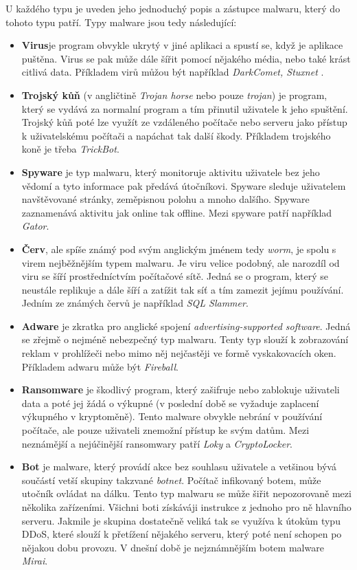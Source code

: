U každého typu je uveden jeho jednoduchý popis a zástupce malwaru, který do tohoto typu patří. Typy malware jsou tedy následující: \cite{kaspersky,article_malware,malware_book,malware_wiki} %
\begin{itemize}
    \item \textbf{Virus}je program obvykle ukrytý v jiné aplikaci a spustí se, když je aplikace puštěna. Virus se pak může dále šířit pomocí nějakého média, nebo také krást citlivá data. Příkladem virů můžou být například \textit{DarkComet, Stuxnet} \cite{malware_types}. 
    \item \textbf{Trojský kůň} (v angličtině \textit{Trojan horse} nebo pouze \textit{trojan}) je program, který se vydává za normalní program a tím přinutil uživatele k jeho spuštění. Trojský kůň poté lze využít ze vzdáleného počítače nebo serveru jako přístup k uživatelskému počítači a napáchat tak další škody. Příkladem trojského koně je třeba \textit{TrickBot}.  
    \item \textbf{Spyware} je typ malwaru, který monitoruje aktivitu uživatele bez jeho vědomí a tyto informace pak předává útočníkovi. Spyware sleduje uživatelem navštěvované stránky, zeměpisnou polohu a mnoho dalšího. Spyware zaznamenává aktivitu jak online tak offline. Mezi spyware patří například \textit{Gator}.
    \item \textbf{Červ}, ale spíše známý pod svým anglickým jménem tedy \textit{worm}, je spolu s virem nejběžnějším typem malwaru. Je viru velice podobný, ale narozdíl od viru se šíří prostředníctvím počítačové sítě. Jedná se o program, který se neustále replikuje a dále šíří a zatížit tak síť a tím zamezit jejímu používání. Jedním ze známých červů je například \textit{SQL Slammer}. 
    \newpage
    \item \textbf{Adware} je zkratka pro anglické spojení \textit{advertising-supported software}. Jedná se zřejmě o nejméně nebezpečný typ malwaru. Tenty typ slouží k zobrazování reklam v prohlížeči nebo mimo něj nejčastěji ve formě vyskakovacích oken. Příkladem adwaru může být \textit{Fireball}.
    \item \textbf{Ransomware} je škodlivý program, který zašifruje nebo zablokuje uživateli data a poté jej žádá o výkupné (v poslední době se vyžaduje zaplacení výkupného v kryptoměně). Tento malware obvykle nebrání v používání počítače, ale pouze uživateli znemožní přístup ke svým datům. Mezi neznámější a nejúčinější ransomwary patří \textit{Loky} a \textit{CryptoLocker}.
    \item \textbf{Bot} \label{botnets} je malware, který provádí akce bez souhlasu uživatele a vetšinou bývá součástí vetší skupiny takzvané \textit{botnet}. Počítač infikovaný botem, může utočník ovládat na dálku. Tento typ malwaru se může šiřit nepozorovaně mezi několika zařízeními. Všichni boti získáváji instrukce z jednoho pro ně hlavního serveru. Jakmile je skupina dostatečně veliká tak se využíva k útokům typu DDoS, které slouží k přetížení nějakého serveru, který poté není schopen po nějakou dobu provozu. V dnešní době je nejznámnějším botem malware \textit{Mirai}.
\end{itemize}

